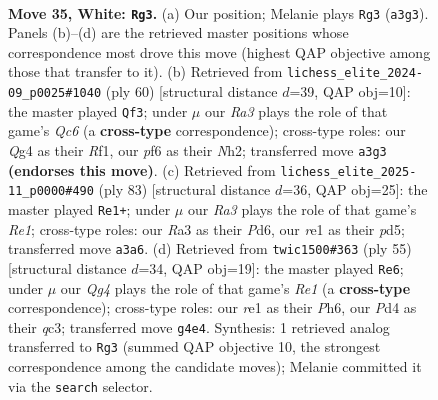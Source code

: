 \documentclass[11pt]{article}
\begin{document}
\clearpage

\begin{figure}[p]\centering
\begin{subfigure}{0.46\textwidth}\centering
\resizebox{\linewidth}{!}{%
\newchessgame
\chessboard[
  setfen={7k/p2p3n/2p2p2/8/1P1P2Q1/R7/5PKP/2q1r3 w - - 2 35},
  showmover=false,
  pgfstyle=straightmove, color=movearrow, markmove={a3-g3}
]}
\caption{}
\end{subfigure}\hfill
\begin{subfigure}{0.46\textwidth}\centering
\resizebox{\linewidth}{!}{%
\newchessgame
\chessboard[
  setfen={3r2k1/p4pp1/2Qqp3/7p/P7/7P/6PN/5R1K w - - 2 31},
  showmover=false,
  pgfstyle=straightmove, color=movearrow, markmove={c6-f3}
]}
\caption{}
\end{subfigure}
\\[4pt]
\begin{subfigure}{0.46\textwidth}\centering
\resizebox{\linewidth}{!}{%
\newchessgame
\chessboard[
  setfen={4rk2/5p2/2Qp1p2/3P3p/1P1q4/P5P1/2R4P/1K6 b - - 14 42},
  showmover=false,
  pgfstyle=straightmove, color=movearrow, markmove={e8-e1}
]}
\caption{}
\end{subfigure}\hfill
\begin{subfigure}{0.46\textwidth}\centering
\resizebox{\linewidth}{!}{%
\newchessgame
\chessboard[
  setfen={4r1k1/2R2pp1/p2q3p/8/P7/2QP3P/6P1/6K1 b - - 0 28},
  showmover=false,
  pgfstyle=straightmove, color=movearrow, markmove={e8-e6}
]}
\caption{}
\end{subfigure}
\caption{\textbf{Move 35, White: \texttt{Rg3}.} (a) Our position; Melanie plays \texttt{Rg3} (\texttt{a3g3}). Panels (b)--(d) are the retrieved master positions whose correspondence most drove this move (highest QAP objective among those that transfer to it). (b) Retrieved from \texttt{lichess\_elite\_2024-09\_p0025\#1040} (ply 60) [structural distance $d$=39, QAP obj=10]: the master played \texttt{Qf3}; under $\mu$ our \emph{Ra3} plays the role of that game's \emph{Qc6} (a \textbf{cross-type} correspondence); cross-type roles: our \emph{Q}g4 as their \emph{R}f1, our \emph{p}f6 as their \emph{N}h2; transferred move \texttt{a3g3} \textbf{(endorses this move)}. (c) Retrieved from \texttt{lichess\_elite\_2025-11\_p0000\#490} (ply 83) [structural distance $d$=36, QAP obj=25]: the master played \texttt{Re1+}; under $\mu$ our \emph{Ra3} plays the role of that game's \emph{Re1}; cross-type roles: our \emph{R}a3 as their \emph{P}d6, our \emph{r}e1 as their \emph{p}d5; transferred move \texttt{a3a6}. (d) Retrieved from \texttt{twic1500\#363} (ply 55) [structural distance $d$=34, QAP obj=19]: the master played \texttt{Re6}; under $\mu$ our \emph{Qg4} plays the role of that game's \emph{Re1} (a \textbf{cross-type} correspondence); cross-type roles: our \emph{r}e1 as their \emph{P}h6, our \emph{P}d4 as their \emph{q}c3; transferred move \texttt{g4e4}. Synthesis: 1 retrieved analog transferred to \texttt{Rg3} (summed QAP objective 10, the strongest correspondence among the candidate moves); Melanie committed it via the \texttt{search} selector.}
\label{fig:thought-m68}
\end{figure}
\end{document}
